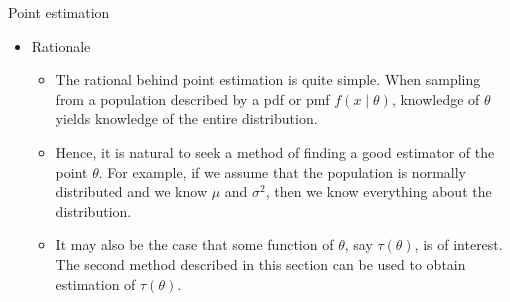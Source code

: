 \documentclass{article}
\begin{document}
Point estimation\bigskip
\begin{itemize}
    \item Rationale
    \begin{itemize}
        \item The rational behind point estimation is quite simple. When sampling from a population described by a pdf or pmf $f(x \mid \theta)$, knowledge of $\theta$ yields knowledge of the entire distribution.
    \item[] Hence, it is natural to seek a method of finding a good estimator of the point $\theta$. For example, if we assume that the population is normally distributed and we know $\mu$ and $\sigma^2$, then we know everything about the distribution.
    \item It may also be the case that some function of $\theta$, say $\tau(\theta)$, is of interest. The second method described in this section can be used to obtain estimation of $\tau(\theta)$.
    \end{itemize}\bigskip
    
    \newpage


\end{itemize}
\end{document}
